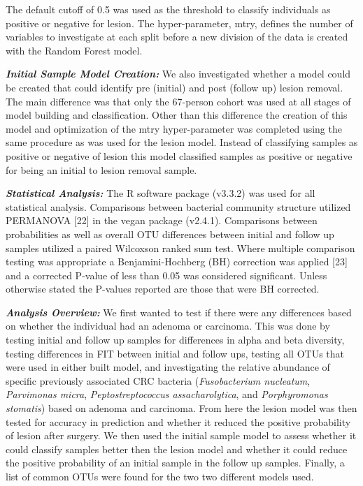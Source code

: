 \documentclass[12pt,]{article}
\begin{document}
The default cutoff of 0.5 was used as the threshold to classify
individuals as positive or negative for lesion. The hyper-parameter,
mtry, defines the number of variables to investigate at each split
before a new division of the data is created with the Random Forest
model.

\textbf{\emph{Initial Sample Model Creation:}} We also investigated
whether a model could be created that could identify pre (initial) and
post (follow up) lesion removal. The main difference was that only the
67-person cohort was used at all stages of model building and
classification. Other than this difference the creation of this model
and optimization of the mtry hyper-parameter was completed using the
same procedure as was used for the lesion model. Instead of classifying
samples as positive or negative of lesion this model classified samples
as positive or negative for being an initial to lesion removal sample.

\textbf{\emph{Statistical Analysis:}} The R software package (v3.3.2)
was used for all statistical analysis. Comparisons between bacterial
community structure utilized PERMANOVA {[}22{]} in the vegan package
(v2.4.1). Comparisons between probabilities as well as overall OTU
differences between initial and follow up samples utilized a paired
Wilcoxson ranked sum test. Where multiple comparison testing was
appropriate a Benjamini-Hochberg (BH) correction was applied {[}23{]}
and a corrected P-value of less than 0.05 was considered significant.
Unless otherwise stated the P-values reported are those that were BH
corrected.

\textbf{\emph{Analysis Overview:}} We first wanted to test if there were
any differences based on whether the individual had an adenoma or
carcinoma. This was done by testing initial and follow up samples for
differences in alpha and beta diversity, testing differences in FIT
between initial and follow ups, testing all OTUs that were used in
either built model, and investigating the relative abundance of specific
previously associated CRC bacteria (\emph{Fusobacterium nucleatum},
\emph{Parvimonas micra}, \emph{Peptostreptococcus assacharolytica}, and
\emph{Porphyromonas stomatis}) based on adenoma and carcinoma. From here
the lesion model was then tested for accuracy in prediction and whether
it reduced the positive probability of lesion after surgery. We then
used the initial sample model to assess whether it could classify
samples better then the lesion model and whether it could reduce the
positive probability of an initial sample in the follow up samples.
Finally, a list of common OTUs were found for the two two different
models used.
\end{document}
